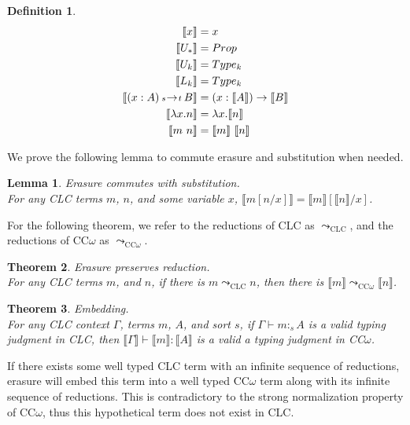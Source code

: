 \documentclass{article}
\newtheorem{theorem}{Theorem}[section]
\newtheorem{lemma}[theorem]{Lemma}
\theoremstyle{definition}
\newtheorem{definition}{Definition}[section]
\newcommand{\stype}[1]{:_#1}
\newcommand{\pstep}{\leadsto}
\newcommand{\arw}[2]
{\hspace*{0.2em}{\scriptstyle #1}\hspace*{-0.2em}
\rightarrow
\hspace*{-0.2em}{\scriptstyle #2}\hspace*{0.2em}}
\newcommand{\erase}[1]{\llbracket #1 \rrbracket}
\begin{document}
  \begin{definition}
    \begin{align*}
      \erase{x} &= x \\
      \erase{U_*} &= Prop \\
      \erase{U_k} &= Type_k \\
      \erase{L_k} &= Type_k \\
      \erase{(x : A) \arw{s}{t} B} &= (x : \erase{A}) \rightarrow \erase{B} \\
      \erase{\lambda x.n} &= \lambda x.\erase{n} \\
      \erase{m\ n} &= \erase{m}\ \erase{n}
    \end{align*}
  \end{definition}

  We prove the following lemma to commute erasure and substitution when needed.
  \begin{lemma} Erasure commutes with substitution. \\ 
    For any CLC terms $m$, $n$, and some variable $x$, $\erase{m[n/x]} = \erase{m}[\erase{n}/x]$. 
  \end{lemma}

  For the following theorem, we refer to the reductions of CLC as $\pstep_{\scriptscriptstyle \text{CLC}}$, and the reductions of CC$\omega$ as $\pstep_{\scriptscriptstyle \text{CC$\omega$}}$.
  \begin{theorem} \label{preserve} Erasure preserves reduction. \\
    For any CLC terms $m$, and $n$, if there is $m \pstep_{\scriptscriptstyle \text{CLC}} n$, then there is $\erase{m} \pstep_{\scriptscriptstyle \text{CC$\omega$}} \erase{n}$.
  \end{theorem}

  \begin{theorem} \label{embedding} Embedding. \\
    For any CLC context $\Gamma$, terms $m$, $A$, and sort $s$, if $\Gamma \vdash m \stype{s} A$ is a valid typing judgment in CLC, then $\erase{\Gamma} \vdash \erase{m} : \erase{A}$ is a valid a typing judgment in CC$\omega$.
  \end{theorem}

  If there exists some well typed CLC term with an infinite sequence of reductions, erasure will embed this term into a well typed CC$\omega$ term along with its infinite sequence of reductions. This is contradictory to the strong normalization property of CC$\omega$, thus this hypothetical term does not exist in CLC.
\end{document}
